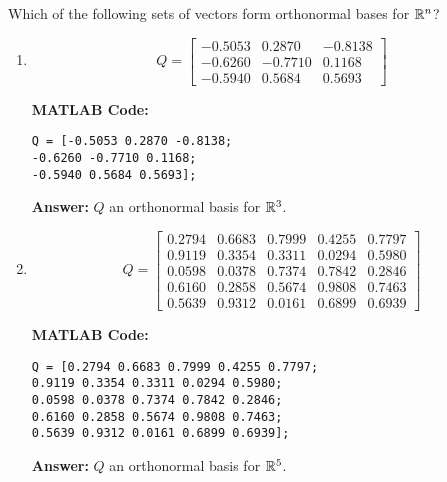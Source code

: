 \documentclass{ximera}
\begin{document}
\begin{example}\label{ex:orthonormal}

Which of the following sets of vectors form orthonormal bases for $\mathbb{R}^n$?

\begin{enumerate}

    \item \[
Q = \begin{bmatrix} 
-0.5053 & 0.2870 & -0.8138 \\ 
-0.6260 & -0.7710 & 0.1168 \\ 
-0.5940 & 0.5684 & 0.5693 
\end{bmatrix}
\]

\textbf{MATLAB Code:}
\begin{verbatim}
Q = [-0.5053 0.2870 -0.8138;
-0.6260 -0.7710 0.1168;
-0.5940 0.5684 0.5693];
\end{verbatim}

\textbf{Answer:}
$Q$  an orthonormal basis for $\mathbb{R}^3$.


\item \[
Q = \begin{bmatrix} 
0.2794 & 0.6683 & 0.7999 & 0.4255 & 0.7797 \\
0.9119 & 0.3354 & 0.3311 & 0.0294 & 0.5980 \\
0.0598 & 0.0378 & 0.7374 & 0.7842 & 0.2846 \\
0.6160 & 0.2858 & 0.5674 & 0.9808 & 0.7463 \\
0.5639 & 0.9312 & 0.0161 & 0.6899 & 0.6939
\end{bmatrix}
\]

\textbf{MATLAB Code:}
\begin{verbatim}
Q = [0.2794 0.6683 0.7999 0.4255 0.7797;
0.9119 0.3354 0.3311 0.0294 0.5980;
0.0598 0.0378 0.7374 0.7842 0.2846;
0.6160 0.2858 0.5674 0.9808 0.7463;
0.5639 0.9312 0.0161 0.6899 0.6939];
\end{verbatim}

\textbf{Answer:}
$Q$  an orthonormal basis for $\mathbb{R}^5$.


\end{enumerate}
\end{example}
\end{document}
